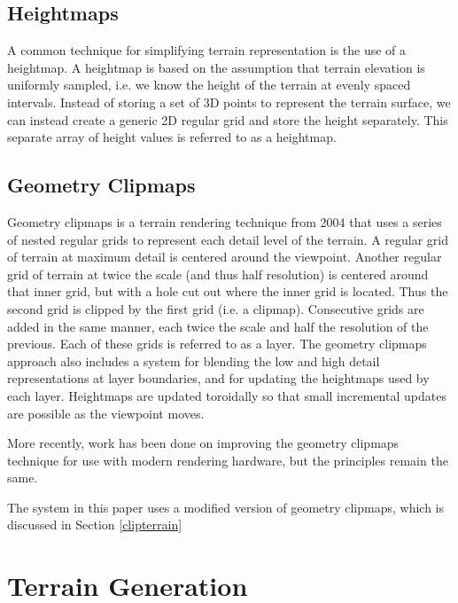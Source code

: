 \subsection{Heightmaps}

A common technique for simplifying terrain representation is the use of a heightmap.
A heightmap is based on the assumption that terrain elevation is uniformly sampled, i.e. we know the height of the terrain at evenly spaced intervals.
Instead of storing a set of 3D points to represent the terrain surface, we can instead create a generic 2D regular grid and store the height separately.
This separate array of height values is referred to as a heightmap.


\subsection{Geometry Clipmaps}

Geometry clipmaps is a terrain rendering technique from 2004 that uses a series of nested regular grids to represent each detail level of the terrain. \cite{geometry_clipmaps}
A regular grid of terrain at maximum detail is centered around the viewpoint.
Another regular grid of terrain at twice the scale (and thus half resolution) is centered around that inner grid, but with a hole cut out where the inner grid is located.
Thus the second grid is clipped by the first grid (i.e. a clipmap).
Consecutive grids are added in the same manner, each twice the scale and half the resolution of the previous.
Each of these grids is referred to as a layer.
The geometry clipmaps approach also includes a system for blending the low and high detail representations at layer boundaries, and for updating the heightmaps used by each layer.
Heightmaps are updated toroidally so that small incremental updates are possible as the viewpoint moves.

More recently, work has been done on improving the geometry clipmaps technique for use with modern rendering hardware, but the principles remain the same. \cite{gems_clipmaps}

The system in this paper uses a modified version of geometry clipmaps, which is discussed in Section \ref{clipterrain}

\section{Terrain Generation}

